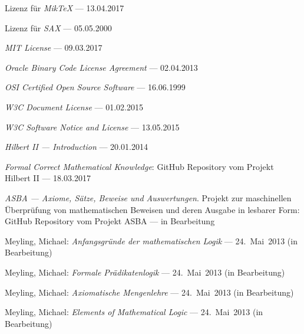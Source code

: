 \begin{flushleft}
\begin{thebibliography}{12}
		 Lizenz für \emph{MikTeX}
		--- 13.04.2017

		 Lizenz für \emph{SAX}
		--- 05.05.2000

		 \emph{MIT License}
		--- 09.03.2017

		 \emph{Oracle Binary Code License Agreement}
		--- 02.04.2013

		 \emph{OSI Certified Open Source Software}
		--- 16.06.1999

		 \emph{W3C Document License}
		--- 01.02.2015

		 \emph{W3C Software Notice and License}
		--- 13.05.2015

		 \emph{Hilbert II --- Introduction}
		--- 20.01.2014

		 \emph{Formal Correct Mathematical Knowledge}:
		GitHub Repository vom Projekt Hilbert II
		--- 18.03.2017

		 \emph{ASBA --- Axiome, Sätze, Beweise und Auswertungen}.
		Projekt zur maschinellen Überprüfung von mathematischen Beweisen
		und deren Ausgabe in lesbarer Form:
		GitHub Repository vom Projekt ASBA
		--- in Bearbeitung

		 Meyling, Michael:
		\emph{Anfangsgründe der mathematischen Logik}
		--- 24.~Mai~2013 (in Bearbeitung)

		 Meyling, Michael:
		\emph{Formale Prädikatenlogik}
		--- 24.~Mai~2013 (in Bearbeitung)

		 Meyling, Michael:
		\emph{Axiomatische Mengenlehre}
		--- 24.~Mai~2013 (in Bearbeitung)

		 Meyling, Michael:
		\emph{Elements of Mathematical Logic}
		--- 24.~Mai~2013 (in Bearbeitung)


\end{thebibliography}
\end{flushleft}
